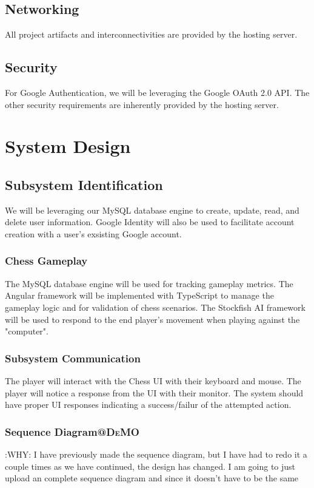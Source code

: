 \documentclass[11pt]{article}
\begin{document}
\subsection{Networking}
\label{sec:org4392613}
All project artifacts and interconnectivities are provided by the
hosting server.
\subsection{Security}
\label{sec:orgca31c3b}
For Google Authentication, we will be leveraging the Google OAuth
2.0 API. The other security requirements are inherently provided by
the hosting server.

\section{System Design}
\label{sec:orgb2304e8}
\subsection{Subsystem Identification}
\label{sec:org49ec099}
We will be leveraging our MySQL database engine to create, update,
read, and delete user information.
Google Identity will also be used to facilitate account creation
with a user's exsisting Google account.
\subsubsection{Chess Gameplay}
\label{sec:org6fcd12c}
The MySQL database engine will be used for tracking gameplay
metrics.
The Angular framework will be implemented with TypeScript to
manage the gameplay logic and for validation of chess scenarios.
The Stockfish AI framework will be used to respond to the end
player's movement when playing against the "computer".
\subsubsection{Subsystem Communication}
\label{sec:org82ae07f}
The player will interact with the Chess UI with their keyboard and
mouse. The player will notice a response from the UI with their
monitor. The system should have proper UI responses indicating a
success/failur of the attempted action.
\subsubsection{Sequence Diagram\hfill{}\textsc{@DeMO}}
\label{sec:org7427d69}
:WHY:
I have previously made the sequence diagram, but I have had to redo it a couple times
as we have continued, the design has changed. I am going to just upload an complete 
sequence diagram and since it doesn't have to be the same 
\end{document}
